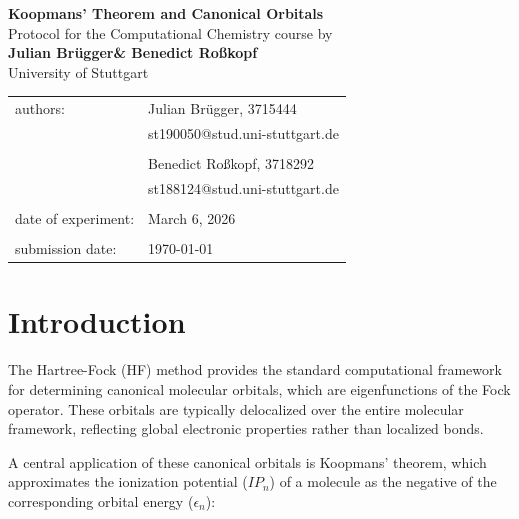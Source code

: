 \documentclass[a4paper,12pt]{scrartcl}
\makeatletter
\newcommand{\VERSUCHSDATUM}{March 6, 2026}
\newcommand{\PROTOKOLLDATUM}{\today}
\newcommand{\VerfasserEINS}{Julian Brügger}
\newcommand{\MatNoEINS}{3715444}
\newcommand{\EmailEINS}{st190050@stud.uni-stuttgart.de}
\newcommand{\VerfasserZWEI}{Benedict Roßkopf}
\newcommand{\MatNoZWEI}{3718292}
\newcommand{\EmailZWEI}{st188124@stud.uni-stuttgart.de}
\newcommand{\VERSUCHSNAME}{Koopmans’ Theorem and Canonical Orbitals}
\makeatother
\begin{document}
\begin{titlepage}
\begin{center}
\Huge{\textbf{\VERSUCHSNAME}}\\
\vspace{10mm}
\Large{Protocol for the Computational Chemistry course by \\ \textbf{\VerfasserEINS\;\& \VerfasserZWEI }}\\
\vspace{10mm} 
\Large{University of Stuttgart}\\
\end{center}
\begin{center}
\begin{tabular}{ll}
\large{authors:}        & \large{\VerfasserEINS, \MatNoEINS} \\
                        & \large{\EmailEINS} \\
                        \vspace{2mm}\\
                        & \large{\VerfasserZWEI, \MatNoZWEI} \\
                        & \large{\EmailZWEI} \\						
                        \vspace{0cm}\\
\large{date of experiment:}	& \large{\VERSUCHSDATUM} \\
\vspace{0cm}\\
\large{submission date:} & \large{\PROTOKOLLDATUM}
\end{tabular}
\end{center}
\end{titlepage}

\section{Introduction}

The Hartree-Fock (HF) method provides the standard computational framework for determining canonical molecular orbitals, which are eigenfunctions of the Fock operator. These orbitals are typically delocalized over the entire molecular framework, reflecting global electronic properties rather than localized bonds. 

A central application of these canonical orbitals is Koopmans' theorem, which approximates the ionization potential ($IP_n$) of a molecule as the negative of the corresponding orbital energy ($\epsilon_n$):
\end{document}
